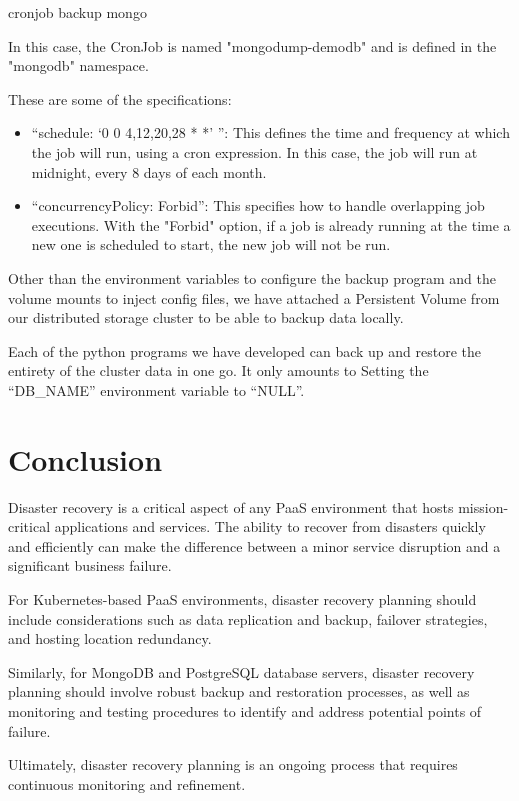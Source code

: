 \begin{listing}
\inputminted[firstline=1,lastline=50]{Yaml}{codeListing/cronjob_backup_mongo.yml}
\end{listing}

\begin{listing}
\inputminted[firstline=51,lastline=100]{Yaml}{codeListing/cronjob_backup_mongo.yml}
\end{listing}

\begin{listing}
\inputminted[firstline=71]{Yaml}{codeListing/cronjob_backup_mongo.yml}
 \caption{cronjob backup mongo}
    \label{lst:cronjob backup mongo}
\end{listing}

In this case, the CronJob is named "mongodump-demodb" and is defined in the "mongodb" namespace. 

These are some of the specifications: 
\begin{itemize}[label={--}]
\item “schedule: ‘0 0 4,12,20,28 * *’ ”: This defines the time and frequency at which the job will run, using a cron expression. In this case, the job will run at midnight, every 8 days of each month. 
\item  “concurrencyPolicy: Forbid”: This specifies how to handle overlapping job executions. With the "Forbid" option, if a job is already running at the time a new one is scheduled to start, the new job will not be run. 
\end{itemize}

Other than the environment variables to configure the backup program and the volume mounts to inject config files, we have attached a Persistent Volume from our distributed storage cluster to be able to backup data locally. 

Each of the python programs we have developed can back up and restore the entirety of the cluster data in one go. It only amounts to Setting the “DB\_NAME” environment variable to “NULL”. 

\section*{Conclusion}
Disaster recovery is a critical aspect of any PaaS environment that hosts mission-critical applications and services. The ability to recover from disasters quickly and efficiently can make the difference between a minor service disruption and a significant business failure. 

For Kubernetes-based PaaS environments, disaster recovery planning should include considerations such as data replication and backup, failover strategies, and hosting location redundancy.  

Similarly, for MongoDB and PostgreSQL database servers, disaster recovery planning should involve robust backup and restoration processes, as well as monitoring and testing procedures to identify and address potential points of failure.  

Ultimately, disaster recovery planning is an ongoing process that requires continuous monitoring and refinement. 
